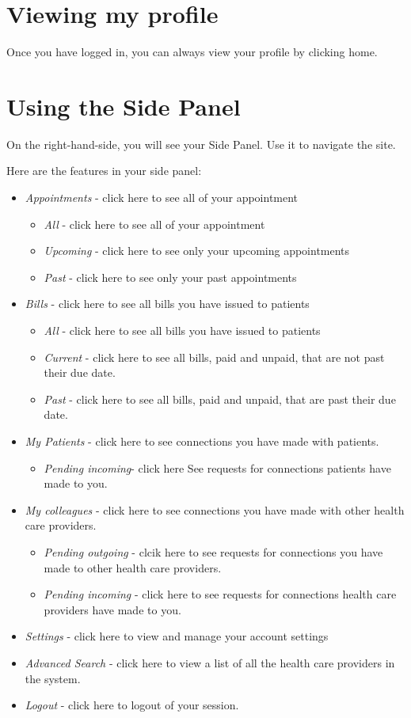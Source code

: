 \documentclass[12pt]{report}
\begin{document}
\section{Viewing my profile}
Once you have logged in, you can always view your profile by clicking home.

\section{Using the Side Panel}
On the right-hand-side, you will see your Side Panel. Use it to navigate the site.

Here are the features in your side panel:
\begin{itemize}
\item \textit{Appointments} - click here to see all of your appointment
\begin{itemize}
\item \textit{All} - click here to see all of your appointment
\item \textit{Upcoming} - click here to see only your upcoming appointments
\item \textit{Past} - click here to see only your past appointments
\end{itemize}
\item \textit{Bills} - click here to see all bills you have issued to patients
\begin{itemize} 
\item \textit{All} - click here to see all bills you have issued to patients
\item \textit{Current} - click here to see all bills, paid and unpaid, that are not past their due date.
\item \textit{Past}  - click here to see all bills, paid and unpaid, that are past their due date.
\end{itemize}
\item \textit{My Patients} - click here to see connections you have made with patients.
\begin{itemize}
\item \textit{Pending incoming}- click here See requests for connections patients have made to you.
\end{itemize}
\item \textit{My colleagues} - click here to see connections you have made with other health care providers.
\begin{itemize}
\item \textit{Pending outgoing} - clcik here to see requests for connections you have made to other health care providers.
\item \textit{Pending incoming} - click here to see requests for connections health care providers have made to you.
\end{itemize}
\item \textit{Settings} - click here to view and manage your account settings
\item \textit{Advanced Search} - click here to view a list of all the health care providers in the system.
\item \textit{Logout} - click here to logout of your session.
\end{itemize}
\end{document}
